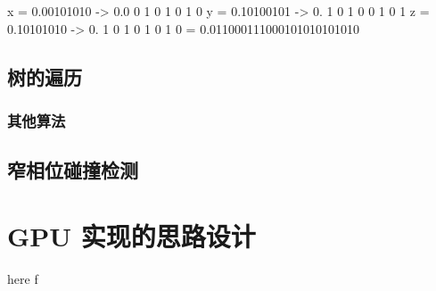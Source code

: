 \begin{codeblock}
x = 0.00101010 -> 0.0  0  1  0  1  0  1  0
y = 0.10100101 -> 0. 1  0  1  0  0  1  0  1
z = 0.10101010 -> 0.  1  0  1  0  1  0  1  0  
                = 0.011000111000101010101010
\end{codeblock}

\subsection{树的遍历}

\subsubsection{其他算法}


\subsection{窄相位碰撞检测}

\section{GPU 实现的思路设计}

here \cite{nvidiaTreeTraversal} f \cite{nvidiaTreeConstruction}


